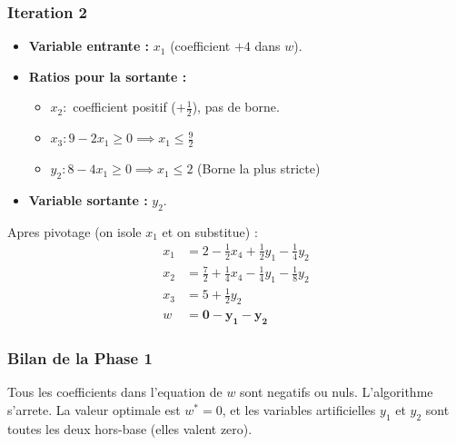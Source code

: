 \documentclass[12pt,a4paper]{article}
\begin{document}
\subsubsection*{Iteration 2}
\begin{itemize}
    \item \textbf{Variable entrante :} $x_1$ (coefficient $+4$ dans $w$).
    \item \textbf{Ratios pour la sortante :} 
    \begin{itemize}
        \item $x_2 :$ coefficient positif ($+\frac{1}{2}$), pas de borne.
        \item $x_3 : 9 - 2x_1 \geq 0 \implies x_1 \leq \frac{9}{2}$
        \item $y_2 : 8 - 4x_1 \geq 0 \implies x_1 \leq 2$ \quad \textcolor{importantrouge}{(Borne la plus stricte)}
    \end{itemize}
    \item \textbf{Variable sortante :} $y_2$.
\end{itemize}

Apres pivotage (on isole $x_1$ et on substitue) :
\begin{align*}
x_1 &= 2 - \frac{1}{2}x_4 + \frac{1}{2}y_1 - \frac{1}{4}y_2 \\
x_2 &= \frac{7}{2} + \frac{1}{4}x_4 - \frac{1}{4}y_1 - \frac{1}{8}y_2 \\
x_3 &= 5 + \frac{1}{2}y_2 \\
w &= \mathbf{0 - y_1 - y_2}
\end{align*}

\subsubsection*{Bilan de la Phase 1}
Tous les coefficients dans l'equation de $w$ sont negatifs ou nuls. L'algorithme s'arrete.
La valeur optimale est $w^* = 0$, et les variables artificielles $y_1$ et $y_2$ sont toutes les deux hors-base (elles valent zero). 
\end{document}
